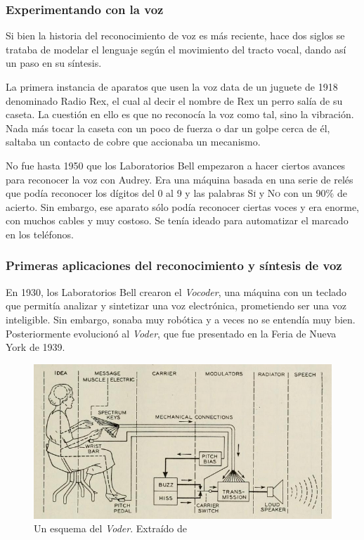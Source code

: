 \subsubsection{Experimentando con la voz}
Si bien la historia del reconocimiento de voz es más reciente, hace dos siglos se trataba de modelar el lenguaje según el movimiento del tracto vocal, dando así un paso en su síntesis.

La primera instancia de aparatos que usen la voz data de un juguete de 1918 denominado Radio Rex, el cual al decir el nombre de Rex un perro salía de su caseta. La cuestión en ello es que no reconocía la voz como tal, sino la vibración. Nada más tocar la caseta con un poco de fuerza o dar un golpe cerca de él, saltaba un contacto de cobre que accionaba un mecanismo.

No fue hasta 1950 que los Laboratorios Bell empezaron a hacer ciertos avances para reconocer la voz con Audrey. Era una máquina basada en una serie de relés que podía reconocer los dígitos del 0 al 9 y las palabras \textsc{Sí} y \textsc{No} con un 90\% de acierto. Sin embargo, ese aparato sólo podía reconocer ciertas voces y era enorme, con muchos cables y muy costoso. Se tenía ideado para automatizar el marcado en los teléfonos.

\subsubsection{Primeras aplicaciones del reconocimiento y síntesis de voz}
En 1930, los Laboratorios Bell crearon el \textit{Vocoder}, una máquina con un teclado que permitía analizar y sintetizar una voz electrónica, prometiendo ser una voz inteligible. Sin embargo, sonaba muy robótica y a veces no se entendía muy bien. Posteriormente evolucionó al \textit{Voder}, que fue presentado en la Feria de Nueva York de 1939.

\begin{figure}[H]
	\centering
	\includegraphics[width=\textwidth]{imagenes/Voder.png}
	\caption{Un esquema del \textit{Voder}. Extraído de \cite{voder}}
\end{figure}

